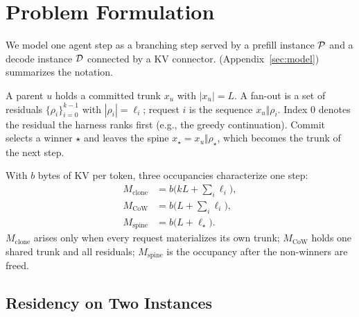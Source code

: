 \section{Problem Formulation}
\label{sec:problem}

We model one agent step as a branching step served by a prefill instance $\mathcal{P}$ and a decode instance $\mathcal{D}$ connected by a KV connector.
 (Appendix~\ref{sec:model}) summarizes the notation.

\begin{definition}
\label{def:step}
A parent $u$ holds a committed trunk $x_u$ with $|x_u|{=}L$.
A fan-out is a set of residuals $\{\rho_i\}_{i=0}^{k-1}$ with $|\rho_i|{=}\ell_i$; request $i$ is the sequence $x_u\Vert\rho_i$.
Index $0$ denotes the residual the harness ranks first (e.g., the greedy continuation).
Commit selects a winner $\star$ and leaves the spine $x_\star=x_u\Vert\rho_\star$, which becomes the trunk of the next step.
\end{definition}

With $b$ bytes of KV per token, three occupancies characterize one step:
\begin{align}
M_{\mathrm{clone}} &= b\bigl(kL+\textstyle\sum_i\ell_i\bigr), \label{eq:mem}\\
M_{\mathrm{CoW}} &= b\bigl(L+\textstyle\sum_i\ell_i\bigr), \nonumber\\
M_{\mathrm{spine}} &= b\bigl(L+\ell_\star\bigr). \nonumber
\end{align}
$M_{\mathrm{clone}}$ arises only when every request materializes its own trunk; $M_{\mathrm{CoW}}$ holds one shared trunk and all residuals; $M_{\mathrm{spine}}$ is the occupancy after the non-winners are freed.

\subsection{Residency on Two Instances}
\label{sec:residency}

